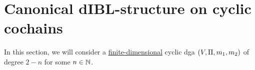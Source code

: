 \documentclass[\MainFolder/Text.tex]{subfiles}
\begin{document}
\section{Canonical dIBL-structure on cyclic cochains
}

\label{Sec:Alg3}
 
In this section, we will consider a \underline{finite-dimensional} cyclic dga $(V,\Pi,m_1,m_2)$ of degree $2-n$ for some $n\in \mathbb{N}$.%
% 
%
\end{document}
